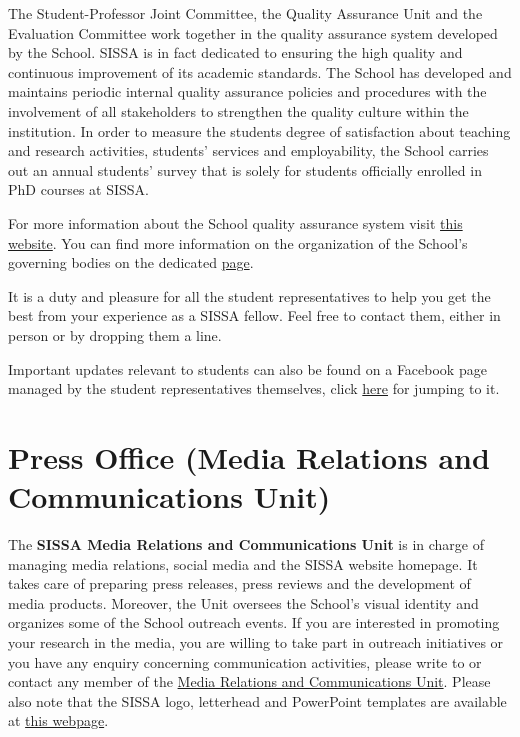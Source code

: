 \documentclass{sissavademecum}
\begin{document}
The Student-Professor Joint Committee, the Quality Assurance Unit and the Evaluation Committee work together in the quality assurance system developed by the School. SISSA is in fact dedicated to ensuring the high quality and continuous improvement of its academic standards. The School has developed and maintains periodic internal quality assurance policies and procedures with the involvement of all stakeholders to strengthen the quality culture within the institution. In order to measure the students degree of satisfaction about teaching and research activities, students' services and employability, the School carries out an annual students' survey that is solely for students officially enrolled in PhD courses at SISSA.

For more information about the School quality assurance system visit \href{https://www.sissa.it/qualita}{this website}. You can find more information on the organization of the School's governing bodies on the dedicated \href{https://www.sissa.it/general-organization}{page}.

It is a duty and pleasure for all the student representatives to help you get the best from your experience as a SISSA fellow. Feel free to contact them, either in person or by dropping them a line.

Important updates relevant to students can also be found on a Facebook page managed by the student representatives themselves, click \href{https://www.facebook.com/groups/sissastudents/}{here} for jumping to it.


\chapter{Press Office (Media Relations and Communications Unit)}

The \textbf{SISSA Media Relations and Communications Unit} is in charge of managing media relations, social media and the SISSA website homepage. It takes care of preparing press releases, press reviews and the development of media products. Moreover, the Unit oversees the School's visual identity and organizes some of the School outreach events. If you are interested in promoting your research in the media, you are willing to take part in outreach initiatives or you have any enquiry concerning communication activities, please write to  or contact any member of the \href{https://www.sissa.it/media-and-press}{Media Relations and Communications Unit}. Please also note that the SISSA logo, letterhead and PowerPoint templates are available at \href{https://www.sissa.it/researchers-and-sissa-staff}{this webpage}.
\end{document}
